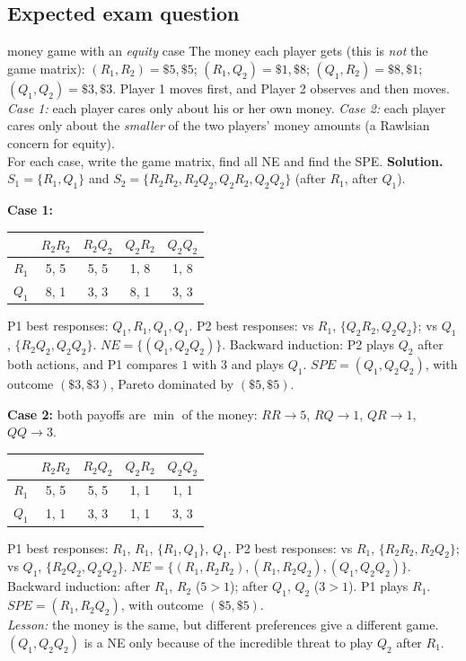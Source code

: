 \documentclass[11pt]{article}
\newcommand{\soln}{\tcblower\textbf{Solution.}\ }
\begin{document}
\subsection*{Expected exam question}
\begin{examq}{money game with an \emph{equity} case}
The money each player gets (this is \emph{not} the game matrix): $(R_1,R_2)=\$5,\$5$; $(R_1,Q_2)=\$1,\$8$; $(Q_1,R_2)=\$8,\$1$; $(Q_1,Q_2)=\$3,\$3$. Player 1 moves first, and Player 2 observes and then moves.\\
\emph{Case 1:} each player cares only about his or her own money.
\emph{Case 2:} each player cares only about the \emph{smaller} of the two players' money amounts (a Rawlsian concern for equity).\\
For each case, write the game matrix, find all NE and find the SPE.
\soln
$S_1=\{R_1,Q_1\}$ and $S_2=\{R_2R_2,R_2Q_2,Q_2R_2,Q_2Q_2\}$ (after $R_1$, after $Q_1$).

\textbf{Case 1:}
\begin{center}
\begin{tabular}{c|cccc}
 & $R_2R_2$ & $R_2Q_2$ & $Q_2R_2$ & $Q_2Q_2$\\\hline
$R_1$ & 5, 5 & 5, 5 & 1, 8 & 1, 8\\
$Q_1$ & 8, 1 & 3, 3 & 8, 1 & 3, 3
\end{tabular}
\end{center}
P1 best responses: $Q_1,R_1,Q_1,Q_1$. P2 best responses: vs $R_1$, $\{Q_2R_2,Q_2Q_2\}$; vs $Q_1$, $\{R_2Q_2,Q_2Q_2\}$. $NE=\{(Q_1,Q_2Q_2)\}$. Backward induction: P2 plays $Q_2$ after both actions, and P1 compares $1$ with $3$ and plays $Q_1$. $SPE=(Q_1,Q_2Q_2)$, with outcome $(\$3,\$3)$, Pareto dominated by $(\$5,\$5)$.

\textbf{Case 2:} both payoffs are $\min$ of the money: $RR\to5$, $RQ\to1$, $QR\to1$, $QQ\to3$.
\begin{center}
\begin{tabular}{c|cccc}
 & $R_2R_2$ & $R_2Q_2$ & $Q_2R_2$ & $Q_2Q_2$\\\hline
$R_1$ & 5, 5 & 5, 5 & 1, 1 & 1, 1\\
$Q_1$ & 1, 1 & 3, 3 & 1, 1 & 3, 3
\end{tabular}
\end{center}
P1 best responses: $R_1$, $R_1$, $\{R_1,Q_1\}$, $Q_1$. P2 best responses: vs $R_1$, $\{R_2R_2,R_2Q_2\}$; vs $Q_1$, $\{R_2Q_2,Q_2Q_2\}$. $NE=\{(R_1,R_2R_2),(R_1,R_2Q_2),(Q_1,Q_2Q_2)\}$. Backward induction: after $R_1$, $R_2$ ($5>1$); after $Q_1$, $Q_2$ ($3>1$). P1 plays $R_1$. $SPE=(R_1,R_2Q_2)$, with outcome $(\$5,\$5)$.\\
\emph{Lesson:} the money is the same, but different preferences give a different game. $(Q_1,Q_2Q_2)$ is a NE only because of the incredible threat to play $Q_2$ after $R_1$.
\end{examq}
\end{document}
